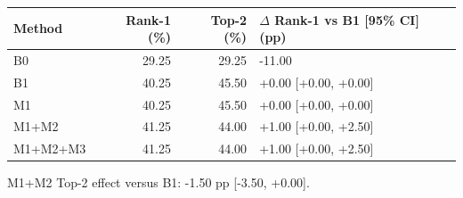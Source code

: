 \begin{table}[t]
\centering
\small
\begin{tabular}{lrrl}
\toprule
Method & Rank-1 (\%) & Top-2 (\%) & $\Delta$ Rank-1 vs B1 [95\% CI] (pp) \\
\midrule
B0 & 29.25 & 29.25 & -11.00 \\
B1 & 40.25 & 45.50 & +0.00 [+0.00, +0.00] \\
M1 & 40.25 & 45.50 & +0.00 [+0.00, +0.00] \\
M1+M2 & 41.25 & 44.00 & +1.00 [+0.00, +2.50] \\
M1+M2+M3 & 41.25 & 44.00 & +1.00 [+0.00, +2.50] \\
\bottomrule
\end{tabular}
\parbox{\linewidth}{\footnotesize M1+M2 Top-2 effect versus B1: -1.50 pp [-3.50, +0.00].}
\end{table}
